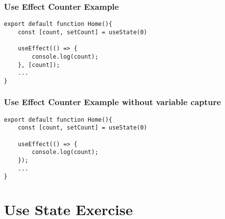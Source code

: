 \documentclass{beamer}
\begin{document}
\begin{frame}[fragile]
\frametitle{Use Effect Counter Example}
\begin{lstlisting}
export default function Home(){
    const [count, setCount] = useState(0)

    useEffect(() => {
        console.log(count);
    }, [count]);
    ...
}
\end{lstlisting}
\end{frame}

\begin{frame}[fragile]
\frametitle{Use Effect Counter Example without variable capture}
\begin{lstlisting}
export default function Home(){
    const [count, setCount] = useState(0)

    useEffect(() => {
        console.log(count);
    });
    ...
}
\end{lstlisting}
\end{frame}

\section{Use State Exercise}
\end{document}
